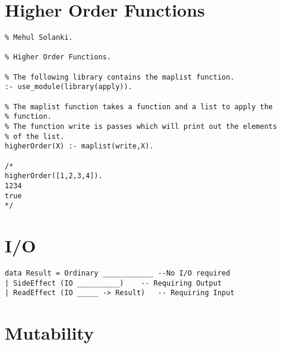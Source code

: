 \documentclass[thesis-solanki.tex]{subfiles}
\begin{document}
\section{Higher Order Functions}

\begin{verbatim}
% Mehul Solanki.

% Higher Order Functions.

% The following library contains the maplist function.
:- use_module(library(apply)).

% The maplist function takes a function and a list to apply the 
% function.
% The function write is passes which will print out the elements 
% of the list.
higherOrder(X) :- maplist(write,X).

/*
higherOrder([1,2,3,4]).
1234
true
*/
\end{verbatim}




\section{I/O}

\begin{verbatim}
data Result = Ordinary ____________ --No I/O required
| SideEffect (IO __________) 	-- Requiring Output
| ReadEffect (IO _____ -> Result) 	-- Requiring Input	

\end{verbatim}




\section{Mutability}




\end{document}
